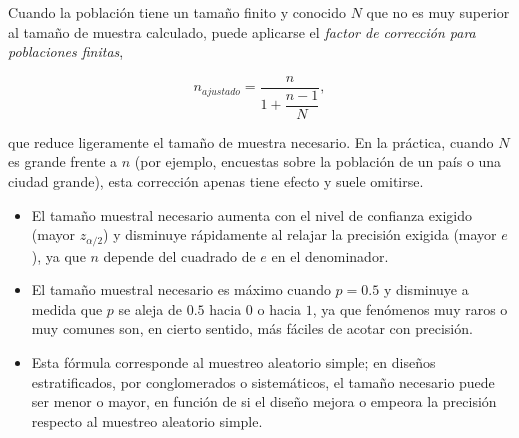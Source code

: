 \documentclass[
  spanish,
  a4paper,
]{scrreport}
\providecommand{\tightlist}{%
  \setlength{\itemsep}{0pt}\setlength{\parskip}{0pt}}
\theoremstyle{definition}
\theoremstyle{definition}
\theoremstyle{remark}
\begin{document}
\begin{tcolorbox}[enhanced jigsaw, arc=.35mm, bottomrule=.15mm, bottomtitle=1mm, breakable, colback=white, colbacktitle=quarto-callout-important-color!10!white, colframe=quarto-callout-important-color-frame, coltitle=black, left=2mm, leftrule=.75mm, opacityback=0, opacitybacktitle=0.6, rightrule=.15mm, title=\textcolor{quarto-callout-important-color}{\faExclamation}\hspace{0.5em}{Importante}, titlerule=0mm, toprule=.15mm, toptitle=1mm]

Cuando la población tiene un tamaño finito y conocido \(N\) que no es
muy superior al tamaño de muestra calculado, puede aplicarse el
\emph{factor de corrección para poblaciones finitas},

\[n_{ajustado} = \frac{n}{1+\dfrac{n-1}{N}},\]

que reduce ligeramente el tamaño de muestra necesario. En la práctica,
cuando \(N\) es grande frente a \(n\) (por ejemplo, encuestas sobre la
población de un país o una ciudad grande), esta corrección apenas tiene
efecto y suele omitirse.

\end{tcolorbox}

\begin{tcolorbox}[enhanced jigsaw, arc=.35mm, bottomrule=.15mm, bottomtitle=1mm, breakable, colback=white, colbacktitle=quarto-callout-note-color!10!white, colframe=quarto-callout-note-color-frame, coltitle=black, left=2mm, leftrule=.75mm, opacityback=0, opacitybacktitle=0.6, rightrule=.15mm, title=\textcolor{quarto-callout-note-color}{\faInfo}\hspace{0.5em}{Interpretación}, titlerule=0mm, toprule=.15mm, toptitle=1mm]

\begin{itemize}
\tightlist
\item
  El tamaño muestral necesario aumenta con el nivel de confianza exigido
  (mayor \(z_{\alpha/2}\)) y disminuye rápidamente al relajar la
  precisión exigida (mayor \(e\)), ya que \(n\) depende del cuadrado de
  \(e\) en el denominador.
\item
  El tamaño muestral necesario es máximo cuando \(p=0.5\) y disminuye a
  medida que \(p\) se aleja de \(0.5\) hacia \(0\) o hacia \(1\), ya que
  fenómenos muy raros o muy comunes son, en cierto sentido, más fáciles
  de acotar con precisión.
\item
  Esta fórmula corresponde al muestreo aleatorio simple; en diseños
  estratificados, por conglomerados o sistemáticos, el tamaño necesario
  puede ser menor o mayor, en función de si el diseño mejora o empeora
  la precisión respecto al muestreo aleatorio simple.
\end{itemize}

\end{tcolorbox}
\end{document}
